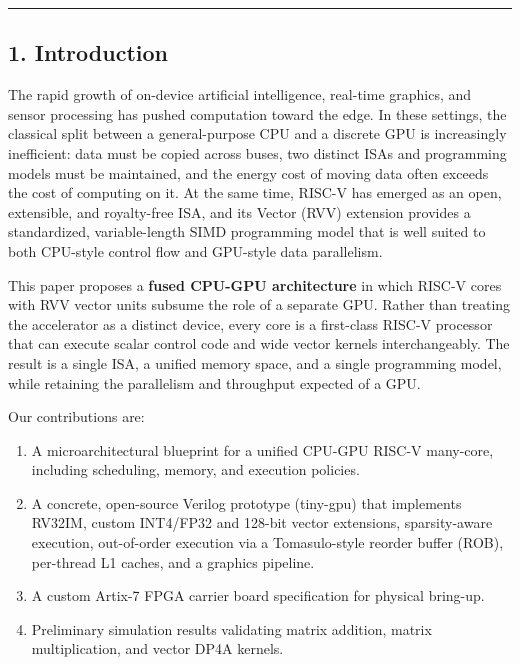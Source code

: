 \begin{center}\rule{0.5\linewidth}{0.5pt}\end{center}

\subsection{1. Introduction}\label{1-introduction}

The rapid growth of on-device artificial intelligence, real-time
graphics, and sensor processing has pushed computation toward the edge.
In these settings, the classical split between a general-purpose CPU and
a discrete GPU is increasingly inefficient: data must be copied across
buses, two distinct ISAs and programming models must be maintained, and
the energy cost of moving data often exceeds the cost of computing on
it. At the same time, RISC-V has emerged as an open, extensible, and
royalty-free ISA, and its Vector (RVV) extension provides a
standardized, variable-length SIMD programming model that is well suited
to both CPU-style control flow and GPU-style data parallelism.

This paper proposes a \textbf{fused CPU-GPU architecture} in which
RISC-V cores with RVV vector units subsume the role of a separate GPU.
Rather than treating the accelerator as a distinct device, every core is
a first-class RISC-V processor that can execute scalar control code and
wide vector kernels interchangeably. The result is a single ISA, a
unified memory space, and a single programming model, while retaining
the parallelism and throughput expected of a GPU.

Our contributions are:

\begin{enumerate}
\def\labelenumi{\arabic{enumi}.}
\tightlist
\item
  A microarchitectural blueprint for a unified CPU-GPU RISC-V many-core,
  including scheduling, memory, and execution policies.
\item
  A concrete, open-source Verilog prototype (tiny-gpu) that implements
  RV32IM, custom INT4/FP32 and 128-bit vector extensions, sparsity-aware
  execution, out-of-order execution via a Tomasulo-style reorder buffer
  (ROB), per-thread L1 caches, and a graphics pipeline.
\item
  A custom Artix-7 FPGA carrier board specification for physical
  bring-up.
\item
  Preliminary simulation results validating matrix addition, matrix
  multiplication, and vector DP4A kernels.
\end{enumerate}

